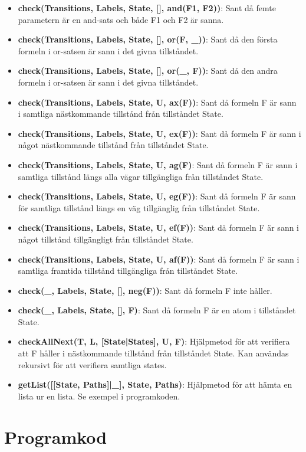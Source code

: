 \documentclass{article}
\begin{document}
  \begin{itemize}

    \item \textbf{check(Transitions, Labels, State, [], and(F1, F2))}: Sant då
      femte parametern är en and-sats och både F1 och F2 är sanna.

    \item \textbf{check(Transitions, Labels, State, [], or(F, \_))}: Sant då
      den första formeln i or-satsen är sann i det givna tillståndet.

    \item \textbf{check(Transitions, Labels, State, [], or(\_, F))}: Sant då den
      andra formeln i or-satsen är sann i det givna tillståndet.

    \item \textbf{check(Transitions, Labels, State, U, ax(F))}: Sant då formeln
      F är sann i samtliga nästkommande tillstånd från tillståndet State.

    \item \textbf{check(Transitions, Labels, State, U, ex(F))}: Sant då formeln
      F är sann i något nästkommande tillstånd från tillståndet State.

    \item \textbf{check(Transitions, Labels, State, U, ag(F)}: Sant då formeln F
      är sann i samtliga tillstånd längs alla vägar tillgängliga från tillståndet
      State. 

    \item \textbf{check(Transitions, Labels, State, U, eg(F))}: Sant då formeln
      F är sann för samtliga tillstånd längs en väg tillgänglig från tillståndet
      State.

    \item \textbf{check(Transitions, Labels, State, U, ef(F))}: Sant då formeln
      F är sann i något tillstånd tillgängligt från tillståndet State.

    \item \textbf{check(Transitions, Labels, State, U, af(F))}: Sant då formeln
      F är sann i samtliga framtida tillstånd tillgängliga från tillståndet
      State.

    \item \textbf{check(\_, Labels, State, [], neg(F))}: Sant då formeln F inte
      håller.

    \item \textbf{check(\_, Labels, State, [], F)}: Sant då formeln F är en atom
      i tillståndet State.

    \item \textbf{checkAllNext(T, L, [State|States], U, F)}: Hjälpmetod för att
      verifiera att F håller i nästkommande tillstånd från tillståndet State.
      Kan användas rekursivt för att verifiera samtliga states.

    \item \textbf{getList([[State, Paths]|\_], State, Paths)}: Hjälpmetod för
      att hämta en lista ur en lista. Se exempel i programkoden.
  \end{itemize}

  \section{Programkod}
  
\end{document}
